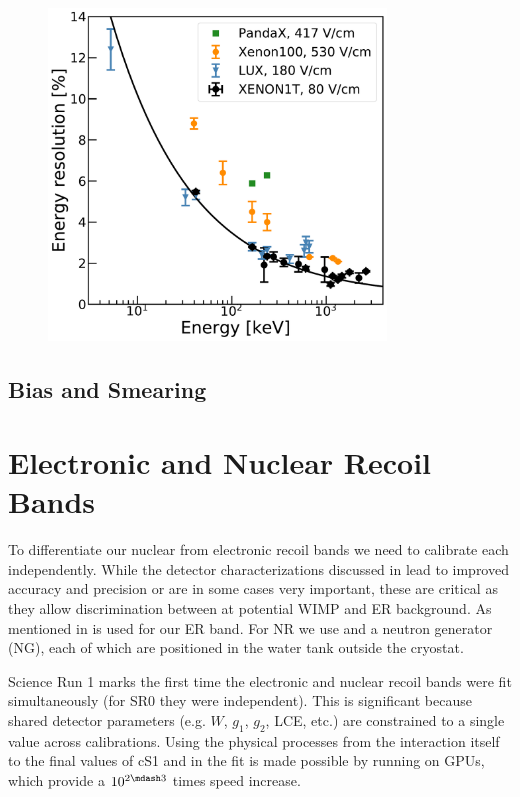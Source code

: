 {\begin{figure}
\centering
\includegraphics[width=0.8\textwidth]{EnergyResolution}
\label{fig:calibrations_photon_charge_efficiences_ces_resolution}
\end{figure}



\subsection{Bias and Smearing}
\label{subsec:det_char_bias_smearing}



\section{Electronic and Nuclear Recoil Bands}
\label{subsec:er_nr_calibrations}
To differentiate our nuclear from electronic recoil bands we need to calibrate each independently.  While the detector characterizations
discussed in  lead to improved accuracy and precision or are in some cases very important, these are critical as
they allow discrimination between at potential WIMP and ER background.  As mentioned in
  is used for our ER band.  For NR we use  and a neutron generator (NG),
each of which are positioned in the water tank outside the cryostat.

Science Run 1 marks the first time the electronic and nuclear recoil bands were fit simultaneously (for SR0 they were independent).  This
is significant because shared detector parameters (e.g. $W$, $g_1$, $g_2$, LCE, etc.) are constrained to a single value
across calibrations.  Using the physical processes from the interaction itself to the final values of cS1 and \cstwob in the fit is made
possible by running on GPUs, which provide a $10^{2 \mdash 3}$ times speed increase.



}
